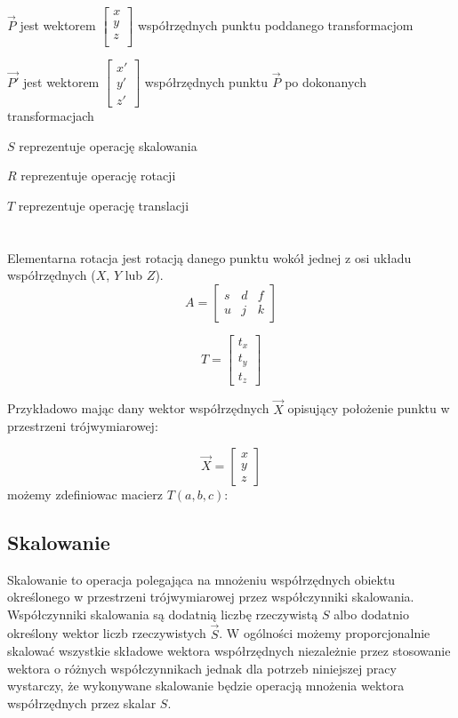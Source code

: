 \documentclass[licencjacka]{pracamgr}
\begin{document}
$\vec{P}$ jest wektorem $\begin{bmatrix} x \\y \\z \\ \end{bmatrix}$ współrzędnych punktu poddanego transformacjom

$\vec{P'}$ jest wektorem $\begin{bmatrix} x'\\ y'\\ z' \end{bmatrix} $ współrzędnych punktu $\vec{P}$ po dokonanych transformacjach

$S$ reprezentuje operację skalowania

$R$ reprezentuje operację rotacji

$T$ reprezentuje operację translacji
\\
\\
\\
Elementarna rotacja jest rotacją danego punktu wokół jednej z osi układu współrzędnych ($X$, $Y$ lub $Z$).
$$
A=\begin{bmatrix}
s & d & f \\
u & j & k
\end{bmatrix}
$$


$$
T=\begin{bmatrix}
t_x \\
t_y \\
t_z
\end{bmatrix}
$$

Przykładowo mając dany wektor współrzędnych $\vec{X}$ opisujący położenie punktu w przestrzeni trójwymiarowej:

$$
\vec{X}=\begin{bmatrix}
x \\
y \\
z
\end{bmatrix}
$$
możemy zdefiniowac macierz $T(a,b,c)$:

\fi

\subsection{Skalowanie}
Skalowanie to operacja polegająca na mnożeniu współrzędnych obiektu określonego w przestrzeni trójwymiarowej przez współczynniki skalowania. Współczynniki skalowania są dodatnią liczbę rzeczywistą $S$ albo dodatnio określony wektor liczb rzeczywistych $\vec{S}$. W ogólności możemy proporcjonalnie skalować wszystkie składowe wektora współrzędnych niezależnie przez stosowanie wektora o różnych współczynnikach jednak dla potrzeb niniejszej pracy wystarczy, że wykonywane skalowanie będzie operacją mnożenia wektora współrzędnych przez skalar $S$.
\end{document}
